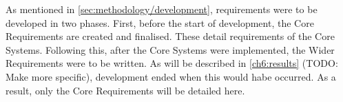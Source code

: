 
As mentioned in \autoref{sec:methodology/development}, requirements were to be developed in two phases. First, before the start of development, the Core Requirements are created and finalised. These detail requirements of the Core Systems. Following this, after the Core Systems were implemented, the Wider Requirements were to be written. As will be described in \autoref{ch6:results} (TODO: Make more specific), development ended when this would habe occurred. As a result, only the Core Requirements will be detailed here.